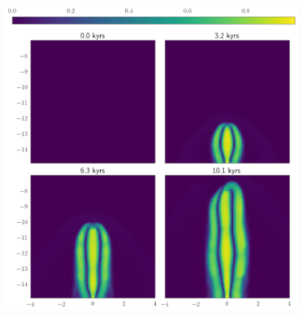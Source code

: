 \begin{figure}[h]
	\centering
	\includegraphics[width=1\linewidth]{DataImages/VnoCool}
	\caption{}
	\label{fig:vnocool}
\end{figure}



